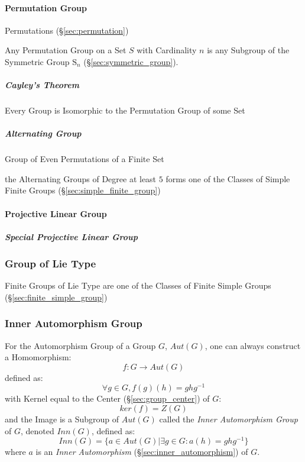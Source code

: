 \begin{itemize}
\paragraph{Permutation Group}\label{sec:permutation_group}\hfill

Permutations (\S\ref{sec:permutation})

Any Permutation Group on a Set $S$ with Cardinality $n$ is any
Subgroup of the Symmetric Group $\mathrm{S}_n$
(\S\ref{sec:symmetric_group}).



\subparagraph{Cayley's Theorem}\label{sec:cayleys_theorem}\hfill

Every Group is Isomorphic to the Permutation Group of some Set



\subparagraph{Alternating Group}\label{sec:alternating_group}\hfill

Group of Even Permutations of a Finite Set

the Alternating Groups of Degree at least $5$ forms one of the Classes of Simple
Finite Groups (\S\ref{sec:simple_finite_group})



\paragraph{Projective Linear Group}\label{sec:projective_linear_group}\hfill

\subparagraph{Special Projective Linear Group}
\label{sec:special_projective_linear_group}\hfill




\subsubsection{Group of Lie Type}\label{sec:lie_type_group}

Finite Groups of Lie Type are one of the Classes of Finite Simple Groups
(\S\ref{sec:finite_simple_group})



\subsubsection{Inner Automorphism Group}\label{sec:inner_automorphism_group}

For the Automorphism Group of a Group $G$, $Aut(G)$, one can always
construct a Homomorphism:
\[
    f : G \rightarrow Aut(G)
\]
defined as:
\[
    \forall g \in G, f (g) (h) = g h g^{-1}
\]
with Kernel equal to the Center (\S\ref{sec:group_center}) of $G$:
\[
    ker(f) = Z(G)
\]
and the Image is a Subgroup of $Aut(G)$ called the \emph{Inner
  Automorphism Group} of $G$, denoted $Inn(G)$, defined as:
\[
    Inn(G) = \{ a \in Aut(G) | \exists g \in G : a(h) = g h g^{-1} \}
\]
where $a$ is an \emph{Inner Automorphism}
(\S\ref{sec:inner_automorphism}) of $G$.


\end{itemize}

